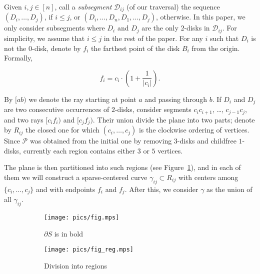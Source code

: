 Given $i,j\in[n]$, call a \textit{subsegment} $\mathcal{D}_{ij}$ (of our traversal) the sequence $(D_i, \ldots, D_j)$, if $i \leq j$, or $(D_i, \ldots, D_n, D_1, \ldots, D_j)$, otherwise. In this paper, we only consider subsegments where $D_i$ and $D_j$ are the only $2$-disks in $\mathcal{D}_{ij}$. For simplicity, we assume that $i\leq j$ in the rest of the paper. For any $i$ such that $D_i$ is not the $0$-disk, denote by $f_i$ the farthest point of the disk $B_i$ from the origin.
Formally,

$$f_i = c_i\cdot\left(1 + \frac{1}{|c_i|}\right).$$

By $[ab)$ we denote the ray starting at point $a$ and passing through $b$. If $D_i$ and $D_j$ are two consecutive occurrences of $2$-disks, consider segments $c_ic_{i+1}$, \ldots, $c_{j-1}c_j$, and two rays $[c_if_i)$ and $[c_jf_j)$. Their union divide the plane into two parts; denote by $R_{ij}$ the closed one for which $(c_i, \ldots, c_j)$ is the clockwise ordering of vertices. Since $\mathcal{P}$ was obtained from the initial one by removing $3$-disks and childfree $1$-disks, currently each region contains either $3$ or $5$ vertices.

The plane is then partitioned into such regions (see Figure~\ref{fig:regions}), and in each of them we will construct a sparse-centered curve $\gamma_{ij}\subset R_{ij}$ with centers among $\{c_i, \ldots, c_j\}$ and with endpoints $f_i$ and $f_j$. After this, we consider $\gamma$ as the union of all $\gamma_{ij}$.

\begin{figure}[h!]
    \centering
    \begin{subfigure}{.4\textwidth}
    \texttt{[image: pics/fig.mps]}
    \caption{$\partial{S}$ is in bold}
    \end{subfigure}
    \begin{subfigure}{.4\textwidth}
    \texttt{[image: pics/fig\_reg.mps]}
    \caption{Division into regions}
    \end{subfigure}
    \caption{}
    \label{fig:regions}
\end{figure}


